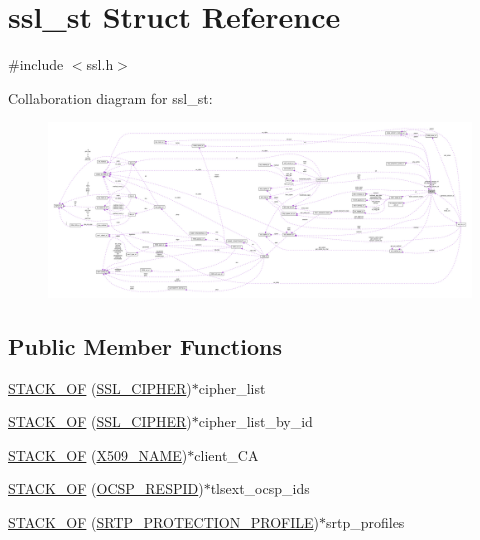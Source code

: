 \hypertarget{structssl__st}{}\section{ssl\+\_\+st Struct Reference}
\label{structssl__st}


{\ttfamily \#include $<$ssl.\+h$>$}



Collaboration diagram for ssl\+\_\+st\+:
\nopagebreak
\begin{figure}[H]
\begin{center}
\leavevmode
\includegraphics[width=350pt]{structssl__st__coll__graph}
\end{center}
\end{figure}
\subsection*{Public Member Functions}
\begin{DoxyCompactItemize}
\item 
\hyperlink{structssl__st_a5ae7275d4f26447455746397ac00232c}{S\+T\+A\+C\+K\+\_\+\+OF} (\hyperlink{ssl_8h_a548d7a5d565a9e0e9bd45c49f8c95701}{S\+S\+L\+\_\+\+C\+I\+P\+H\+ER})$\ast$cipher\+\_\+list
\item 
\hyperlink{structssl__st_ae926fcbe52e4174a9e5ef8fb88282e45}{S\+T\+A\+C\+K\+\_\+\+OF} (\hyperlink{ssl_8h_a548d7a5d565a9e0e9bd45c49f8c95701}{S\+S\+L\+\_\+\+C\+I\+P\+H\+ER})$\ast$cipher\+\_\+list\+\_\+by\+\_\+id
\item 
\hyperlink{structssl__st_a3e6334502ba71000f571d6ddb26b76c5}{S\+T\+A\+C\+K\+\_\+\+OF} (\hyperlink{ossl__typ_8h_a5c5fc036757e87b9bd163d0221696533}{X509\+\_\+\+N\+A\+ME})$\ast$client\+\_\+\+CA
\item 
\hyperlink{structssl__st_acc0a36a4a42e6846ece423336c62ffce}{S\+T\+A\+C\+K\+\_\+\+OF} (\hyperlink{ossl__typ_8h_a88517618d0bd55dce0e63508cabfc37d}{O\+C\+S\+P\+\_\+\+R\+E\+S\+P\+ID})$\ast$tlsext\+\_\+ocsp\+\_\+ids
\item 
\hyperlink{structssl__st_aae6ff6d8a9ae850b7ea3f90fad7b0e5e}{S\+T\+A\+C\+K\+\_\+\+OF} (\hyperlink{ssl_8h_ad71374b5a3df5292d0722b703841292e}{S\+R\+T\+P\+\_\+\+P\+R\+O\+T\+E\+C\+T\+I\+O\+N\+\_\+\+P\+R\+O\+F\+I\+LE})$\ast$srtp\+\_\+profiles
\end{DoxyCompactItemize}
